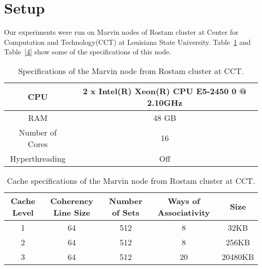 \section{Setup}
Our experiments were run on Marvin nodes of Rostam cluster at Center for Computation and Technology(CCT) at Louisiana State University. Table~\ref{table3} and Table~\ref{4} show some of the specifications of this node.

\vspace{\baselineskip}	
\begin{table}[H]
	\centering
	\scalebox{0.75}
	{\begin{tabular}{|c | c |} 
			\hline
			CPU &  2 x Intel(R) Xeon(R) CPU E5-2450 0 @ 2.10GHz \\ [0.5ex] 
			\hline
			RAM & 48 GB\\ 	
			\hline
			Number of Cores & 16\\
			\hline	
			Hyperthreading & Off \\
			\hline			
	\end{tabular}}	
	\caption{Specifications of the Marvin node from Rostam cluster at CCT.}
	\label{table3}
\end{table} 


\vspace{\baselineskip}	
\begin{table}[H]
	\centering
	\scalebox{0.9}
	{\begin{tabular}{|c | c | c | c | c|} 
			\hline
			Cache Level &  Coherency Line Size & Number of Sets & Ways of Associativity & Size\\ [0.5ex] 
			\hline
			1 & 64 & 512 & 8 & 32KB \\	
			\hline
			2 & 64 & 512 & 8 & 256KB \\
			\hline	
			3 & 64 & 512 & 20 & 20480KB \\
			\hline			
	\end{tabular}}	
	\caption{Cache specifications of the Marvin node from Rostam cluster at CCT.}
	\label{table4}
\end{table} 
\vspace{\baselineskip}	

%
%
%
%
%
%



